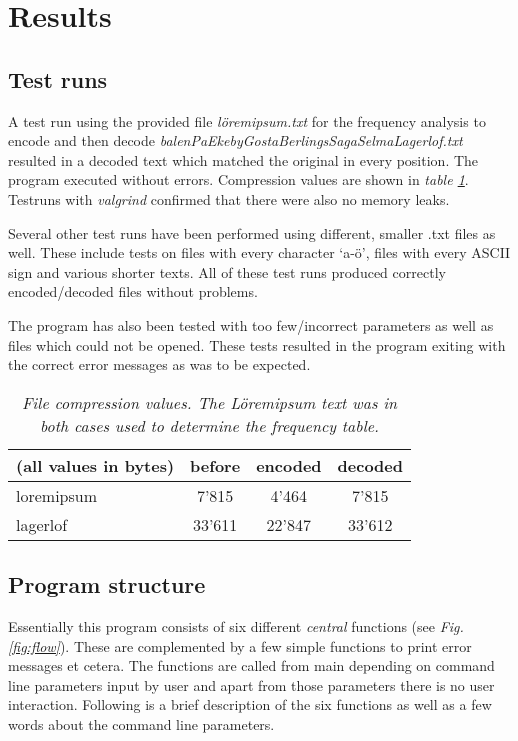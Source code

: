\documentclass[a4paper,11pt,twoside]{article}
\begin{document}
\section{Results}
\subsection{Test runs}
A test run using the provided file \emph{löremipsum.txt} for the
frequency analysis to encode and then decode
\emph{balenPaEkebyGostaBerlingsSagaSelmaLagerlof.txt} resulted in a
decoded text which matched the original in every position. The program
executed without errors. Compression values are shown in \textit{table \ref{tab:compression}}. Testruns with \emph{valgrind} confirmed that 
there were also no memory leaks. 

Several other test runs have been performed using different, smaller
.txt files as well. These include tests on files with every character
`a-ö', files with every ASCII sign and various shorter texts. All of
these test runs produced correctly encoded/decoded files without
problems.


The program has also been tested with too few/incorrect parameters as
well as files which could not be opened. These tests resulted in the
program exiting with the correct error messages as was to be expected.

\begin{table}[]
\centering
\caption{\textit{File compression values. The \emph{Löremipsum} text was in
  both cases used to determine the frequency table.}}
\label{tab:compression}
\begin{tabular}{lccc}
(all values in bytes) & \multicolumn{1}{l}{before} & \multicolumn{1}{l}{encoded} & \multicolumn{1}{l}{decoded} \\ \hline
loremipsum            & 7'815                      & 4'464
& 7'815                       \\
lagerlof              & 33'611                     & 22'847
& 33'612                     
\end{tabular}
\end{table}


\subsection{Program structure}
Essentially this program consists of six different \emph{central}
functions (see \textit{Fig. \ref{fig:flow}}). These are complemented by a few simple functions to print
error messages et cetera. The functions are called from main depending
on command line parameters input by user and apart from those
parameters there is no user interaction. Following is a brief
description of the six functions as well as a few words about the
command line parameters.
\end{document}

